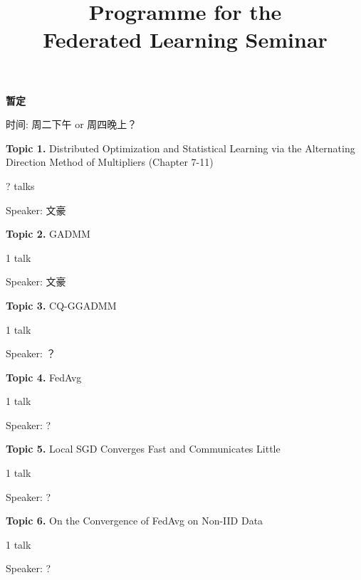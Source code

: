 
\title{\Huge Programme for the \\ Federated Learning Seminar}
\author{}
\date{}

\maketitle

{\bfseries \large 暂定}

\vspace{1em}

时间: 周二下午 or 周四晚上？

\vspace{2em}

{\bfseries \large Topic 1.} Distributed Optimization and Statistical Learning via the Alternating Direction Method of Multipliers (Chapter 7-11) \cite{boyd2011distributed}

? talks

Speaker: 文豪

\vspace{2em}

{\bfseries \large Topic 2.} GADMM \cite{elgabli2020gadmm}

1 talk

Speaker: 文豪

\vspace{2em}

{\bfseries \large Topic 3.} CQ-GGADMM \cite{issaid2020cq-ggadmm}

1 talk

Speaker: ？

\vspace{2em}

{\bfseries \large Topic 4.} FedAvg \cite{mcmahan2017fed_avg}

1 talk

Speaker: ?

\vspace{2em}

{\bfseries \large Topic 5.} Local SGD Converges Fast and Communicates Little \cite{stich2018local}

1 talk

Speaker: ?

\vspace{2em}

{\bfseries \large Topic 6.} On the Convergence of FedAvg on Non-IID Data \cite{li2019convergence}

1 talk

Speaker: ?

\vspace{2em}

